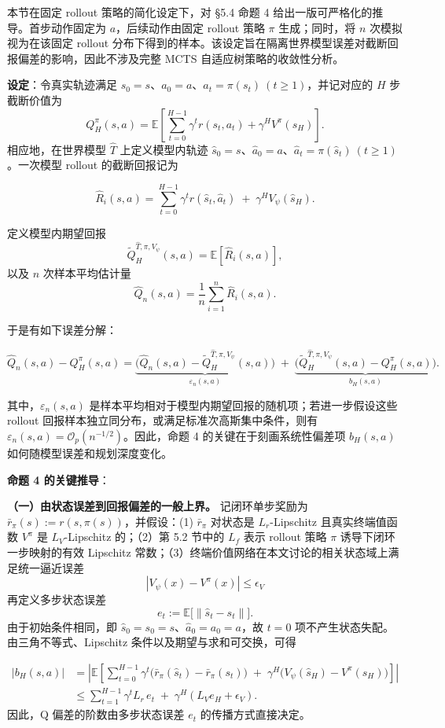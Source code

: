 \documentclass[UTF8]{ctexart}
\begin{document}
本节在固定 rollout 策略的简化设定下，对 §5.4 命题 4 给出一版可严格化的推导。首步动作固定为 \(a\)，后续动作由固定 rollout 策略 \(\pi\) 生成；同时，将 \(n\) 次模拟视为在该固定 rollout 分布下得到的样本。该设定旨在隔离世界模型误差对截断回报偏差的影响，因此不涉及完整 MCTS 自适应树策略的收敛性分析。

\textbf{设定}：令真实轨迹满足 \(s_0=s\)、\(a_0=a\)、\(a_t=\pi(s_t)\ (t\ge1)\)，并记对应的 \(H\) 步截断价值为
\[
Q_H^\pi(s,a)
=
\mathbb E\!\left[
\sum_{t=0}^{H-1}\gamma^t r(s_t,a_t)+\gamma^H V^\pi(s_H)
\right].
\]
相应地，在世界模型 \(\hat T\) 上定义模型内轨迹 \(\hat s_0=s\)、\(\hat a_0=a\)、\(\hat a_t=\pi(\hat s_t)\ (t\ge1)\)。一次模型 rollout 的截断回报记为

\[
\hat{R}_i(s,a)
=
\sum_{t=0}^{H-1} \gamma^t r(\hat{s}_t,\hat{a}_t)
\;+\;
\gamma^H V_\psi(\hat{s}_H).
\]

定义模型内期望回报
\[
\tilde Q_H^{\hat T,\pi,V_\psi}(s,a)
=
\mathbb E[\hat R_i(s,a)],
\]
以及 \(n\) 次样本平均估计量
\[
\hat{Q}_n(s,a) = \frac{1}{n} \sum_{i=1}^n \hat{R}_i(s,a).
\]

于是有如下误差分解：

\[
\hat{Q}_n(s,a) - Q^\pi_H(s,a)
=
\underbrace{\bigl(\hat Q_n(s,a)-\tilde Q_H^{\hat T,\pi,V_\psi}(s,a)\bigr)}_{\varepsilon_n(s,a)}
\;+\;
\underbrace{\bigl(\tilde Q_H^{\hat T,\pi,V_\psi}(s,a)-Q_H^\pi(s,a)\bigr)}_{b_H(s,a)}.
\]

其中，\(\varepsilon_n(s,a)\) 是样本平均相对于模型内期望回报的随机项；若进一步假设这些 rollout 回报样本独立同分布，或满足标准次高斯集中条件，则有 \(\varepsilon_n(s,a)=\mathcal O_p(n^{-1/2})\)。因此，命题 4 的关键在于刻画系统性偏差项 \(b_H(s,a)\) 如何随模型误差和规划深度变化。

\textbf{命题 4 的关键推导}：

\textbf{（一）由状态误差到回报偏差的一般上界。} 记闭环单步奖励为 \(\bar r_\pi(s):=r(s,\pi(s))\)，并假设：(1) \(\bar r_\pi\) 对状态是 \(L_r\)-Lipschitz 且真实终端值函数 \(V^\pi\) 是 \(L_V\)-Lipschitz 的；（2）第 5.2 节中的 \(L_f\) 表示 rollout 策略 \(\pi\) 诱导下闭环一步映射的有效 Lipschitz 常数；（3）终端价值网络在本文讨论的相关状态域上满足统一逼近误差
\[
|V_\psi(x)-V^\pi(x)|\le \epsilon_V
\]
再定义多步状态误差
\[
e_t := \mathbb E\bigl[\|\hat s_t-s_t\|\bigr].
\]
由于初始条件相同，即 \(\hat s_0=s_0=s\)、\(\hat a_0=a_0=a\)，故 \(t=0\) 项不产生状态失配。由三角不等式、Lipschitz 条件以及期望与求和可交换，可得

\[
\begin{aligned}
|b_H(s,a)|
&=
\left|
\mathbb E\!\left[
\sum_{t=0}^{H-1}\gamma^t \bigl(\bar r_\pi(\hat s_t)-\bar r_\pi(s_t)\bigr)
\;+\;
\gamma^H\bigl(V_\psi(\hat s_H)-V^\pi(s_H)\bigr)
\right]
\right| \\
&\le
\sum_{t=1}^{H-1}\gamma^t L_r\, e_t
\;+\;
\gamma^H\!\left(L_V e_H + \epsilon_V\right).
\end{aligned}
\]
因此，Q 偏差的阶数由多步状态误差 \(e_t\) 的传播方式直接决定。
\end{document}
